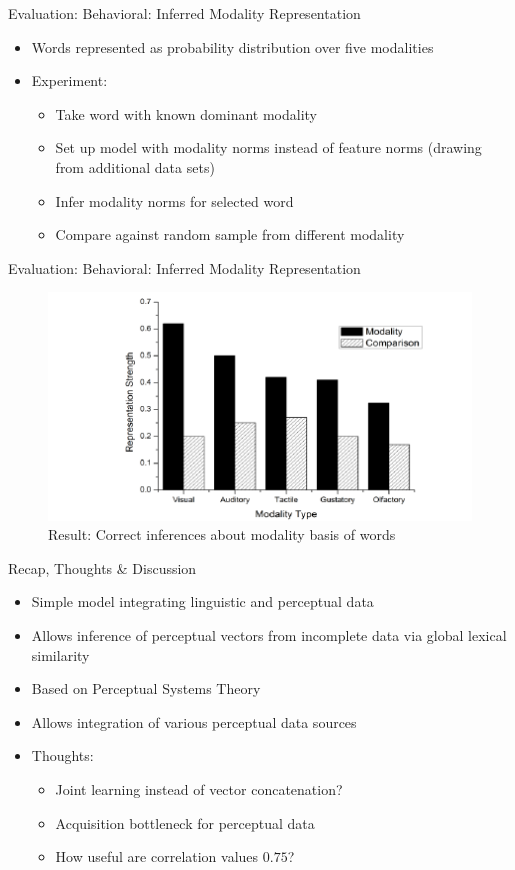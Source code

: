 \documentclass[12pt,a4paper]{beamer}
\begin{document}
\begin{frame}{Evaluation: Behavioral: Inferred Modality Representation}
\begin{itemize}
\item Words represented as probability distribution over five modalities
\item Experiment:
    \begin{itemize}
    \item Take word with known dominant modality
    \item Set up model with modality norms instead of feature norms (drawing from additional data sets)
    \item Infer modality norms for selected word
    \item Compare against random sample from different modality
    \end{itemize}
\end{itemize}
\end{frame}

\begin{frame}{Evaluation: Behavioral: Inferred Modality Representation}
\begin{figure}
\includegraphics[scale=0.7]{figure_5_level_of_strength_for_different_modalities.png}
\caption{Result: Correct inferences about modality basis of words}
\end{figure}
\end{frame}



\begin{frame}{Recap, Thoughts \& Discussion}
\begin{itemize}
\item Simple model integrating linguistic and perceptual data
\item Allows inference of perceptual vectors from incomplete data via global lexical similarity
\item Based on Perceptual Systems Theory
\item Allows integration of various perceptual data sources
\item Thoughts:
    \begin{itemize}
    \item Joint learning instead of vector concatenation?
    \item Acquisition bottleneck for perceptual data
    \item How useful are correlation values $0.75$?
    \end{itemize}
\end{itemize}
\end{frame}
\end{document}
